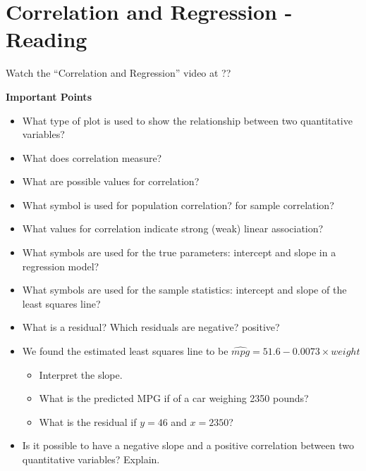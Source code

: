 \def\theTopic{Reading 15}

\section{Correlation and Regression - Reading}

Watch the ``Correlation and Regression'' video at ??


\begin{center}
  {\bf Important Points}
\end{center}

\begin{itemize}
\item What type of plot is used to show the relationship between two
  quantitative variables?\vspace{2cm}
\item What does correlation measure?\vspace{2cm}
\item What are possible values for correlation?  \vspace{2cm}
\item What symbol is used for population correlation?  for sample
  correlation? \vspace{2cm}  
\item What values for correlation indicate strong (weak) linear
  association?\vspace{2cm} 
\item  What symbols are used for the true parameters: intercept and
  slope in a regression model?\vspace{2cm}
\item  What symbols are used for the sample statistics: intercept and
  slope of the least squares line? \vspace{2cm}
\item  What is a residual? Which residuals are negative? positive?\vspace{2cm}
\item  We found the estimated least squares line to be
      $\widehat{mpg} = 51.6-0.0073 \times{weight}$ 
      \begin{itemize}
      \item Interpret the slope.\vspace{2cm}
      \item What is the predicted MPG if of a car weighing 2350 pounds? \vspace{2cm}
      \item What is the residual if $y = 46$ and $x = 2350$?\vspace{2cm}  
      \end{itemize}
\item Is it possible to have a negative slope and a positive
  correlation between two quantitative variables? Explain.\vspace*{\fill}
\end{itemize}
